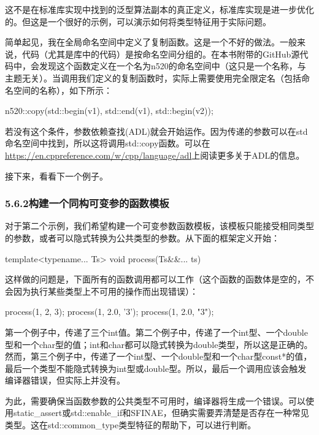 这不是在标准库实现中找到的泛型算法副本的真正定义，标准库实现是进一步优化的。但这是一个很好的示例，可以演示如何将类型特征用于实际问题。

简单起见，我在全局命名空间中定义了复制函数。这是一个不好的做法。一般来说，代码（尤其是库中的代码）是按命名空间分组的。在本书附带的GitHub源代码中，会发现这个函数定义在一个名为n520的命名空间中（这只是一个名称，与主题无关）。当调用我们定义的复制函数时，实际上需要使用完全限定名（包括命名空间的名称），如下所示：

\begin{cpp}
n520::copy(std::begin(v1), std::end(v1), std::begin(v2));
\end{cpp}

若没有这个条件，参数依赖查找(ADL)就会开始运作。因为传递的参数可以在std命名空间中找到，所以这将调用std::copy函数。可以在\url{https://en.cppreference.com/w/cpp/language/adl}上阅读更多关于ADL的信息。

接下来，看看下一个例子。

\subsubsection{5.6.2\hspace{0.2cm}构建一个同构可变参的函数模板}

对于第二个示例，我们希望构建一个可变参数函数模板，该模板只能接受相同类型的参数，或者可以隐式转换为公共类型的参数。从下面的框架定义开始：

\begin{cpp}
template<typename... Ts>
void process(Ts&&... ts) {}
\end{cpp}

这样做的问题是，下面所有的函数调用都可以工作（这个函数的函数体是空的，不会因为执行某些类型上不可用的操作而出现错误）：

\begin{cpp}
process(1, 2, 3);
process(1, 2.0, '3');
process(1, 2.0, "3");
\end{cpp}

第一个例子中，传递了三个int值。第二个例子中，传递了一个int型、一个double型和一个char型的值；int和char都可以隐式转换为double类型，所以这是正确的。然而，第三个例子中，传递了一个int型、一个double型和一个char型const*的值，最后一个类型不能隐式转换为int型或double型。所以，最后一个调用应该会触发编译器错误，但实际上并没有。

为此，需要确保当函数参数的公共类型不可用时，编译器将生成一个错误。可以使用static\_assert或std::enable\_if和SFINAE，但确实需要弄清楚是否存在一种常见类型。这在std::common\_type类型特征的帮助下，可以进行判断。

